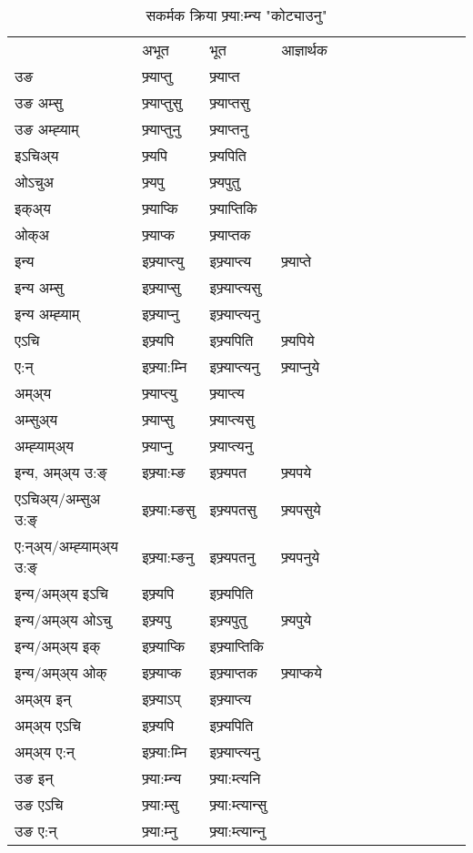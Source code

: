 \begin{table}[H]
\centering
\caption{\label{ɛpt.vt} सकर्मक क्रिया  फ्र्या:म्‍न्य  "कोट्याउनु"  }
\begin{tabular}{l|l|l|l|l|l|l|l|l|l|l|l|l}  \toprule
&अभूत & भूत & आज्ञार्थक \\ 
उङ &फ्र्याप्‍तु &फ्र्याप्‍त \\ 
उङ अम्सु&फ्र्याप्‍तुसु &फ्र्याप्‍तसु \\ 
उङ अम्ह्‍याम्&फ्र्याप्‍तुनु &फ्र्याप्‍तनु \\ 
इऽचिअ्य &फ्र्यपि &फ्र्यपिति   \\ 
ओऽचुअ        &फ्र्यपु &फ्र्यपुतु   \\ 
इक्अ्य&फ्र्याप्कि &फ्र्याप्‍तिकि   \\ 
ओक्अ &फ्र्याप्क &फ्र्याप्‍तक   \\ 
इन्य & इफ्र्याप्‍त्यु  & इफ्र्याप्‍त्य &फ्र्याप्‍ते  \\ 
इन्य अम्सु& इफ्र्याप्सु  & इफ्र्याप्‍त्यसु   \\ 
इन्य अम्ह्‍याम्& इफ्र्याप्‍नु  & इफ्र्याप्‍त्यनु   \\ 
एऽचि & इफ्र्यपि & इफ्र्यपिति &फ्र्यपिये    \\ 
ए:न् & इफ्र्या:म्‍नि  & इफ्र्याप्‍त्यनु &फ्र्याप्‍नुये  \\ 
अम्अ्य & फ्र्याप्‍त्यु  & फ्र्याप्‍त्य  \\ 
अम्सुअ्य & फ्र्याप्सु & फ्र्याप्‍त्यसु  \\ 
अम्ह्‍याम्अ्य & फ्र्याप्‍नु  & फ्र्याप्‍त्यनु \\ 
\midrule
इन्य, अम्अ्य उ:ङ्‌ &इफ्र्या:म्ङ &इफ्र्यपत &फ्र्यपये \\ 
एऽचिअ्य/अम्सुअ उ:ङ्‌ &इफ्र्या:म्ङसु &इफ्र्यपतसु &फ्र्यपसुये \\ 
ए:न्अ्य/अम्ह्‍याम्अ्य उ:ङ्‌ &इफ्र्या:म्ङनु &इफ्र्यपतनु &फ्र्यपनुये \\ 
इन्य/अम्अ्य इऽचि &इफ्र्यपि &इफ्र्यपिति    \\ 
इन्य/अम्अ्य ओऽचु &इफ्र्यपु &इफ्र्यपुतु  &फ्र्यपुये  \\ 
इन्य/अम्अ्य इक् &इफ्र्याप्कि &इफ्र्याप्‍तिकि   \\ 
इन्य/अम्अ्य ओक् &इफ्र्याप्क &इफ्र्याप्‍तक  &फ्र्याप्कये  \\ 
अम्अ्य इन् & इफ्र्याऽप् & इफ्र्याप्‍त्य   \\ 
अम्अ्य एऽचि & इफ्र्यपि & इफ्र्यपिति    \\ 
अम्अ्य ए:न् & इफ्र्या:म्‍नि  & इफ्र्याप्‍त्यनु  \\ 
\midrule
उङ इन् & फ्र्या:म्‍न्य  & फ्र्या:म्त्यनि  \\ 
उङ एऽचि & फ्र्या:म्सु  & फ्र्या:म्त्यान्सु   \\ 
उङ ए:न्& फ्र्या:म्‍नु  & फ्र्या:म्त्यान्‍नु   \\ 
\bottomrule
\end{tabular}
\end{table}



